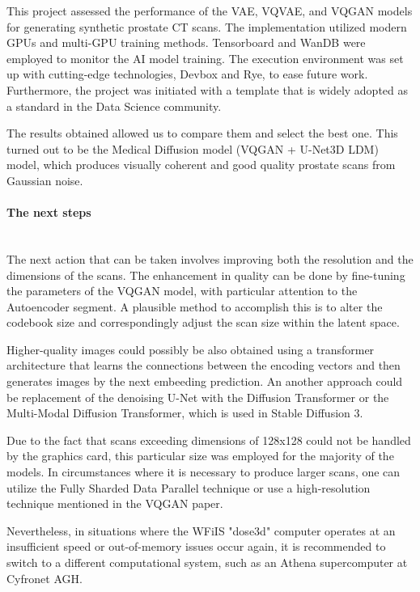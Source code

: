 This project assessed the performance of the VAE, VQVAE, and VQGAN models for generating synthetic prostate CT scans. The implementation utilized modern GPUs and multi-GPU training methods. Tensorboard and WanDB were employed to monitor the AI model training. The execution environment was set up with cutting-edge technologies, Devbox and Rye, to ease future work. Furthermore, the project was initiated with a template that is widely adopted as a standard in the Data Science community.

 The results obtained allowed us to compare them and select the best one. This turned out to be the Medical Diffusion model (VQGAN + U-Net3D LDM) model\cite{khader2023medicaldiffusiondenoisingdiffusion}, which produces visually coherent and good quality prostate scans from Gaussian noise.  

\paragraph{The next steps}\mbox{}\\
\indent The next action that can be taken involves improving both the resolution and the dimensions of the scans. The enhancement in quality can be done by fine-tuning the parameters of the VQGAN model, with particular attention to the Autoencoder segment. A plausible method to accomplish this is to alter the codebook size and correspondingly adjust the scan size within the latent space.

Higher-quality images could possibly be also obtained using a transformer architecture that learns the connections between the encoding vectors and then generates images by the next embeeding prediction\cite{esser2021tamingtransformershighresolutionimage}\cite{khader_transformers_2023}. An another approach could be replacement of the denoising U-Net with the Diffusion Transformer\cite{peebles2023scalablediffusionmodelstransformers} or the Multi-Modal Diffusion Transformer\cite{esser2024scaling}, which is used in Stable Diffusion 3\cite{esser2024scaling}.  

Due to the fact that scans exceeding dimensions of 128x128 could not be handled by the graphics card, this particular size was employed for the majority of the models. In circumstances where it is necessary to produce larger scans, one can utilize the Fully Sharded Data Parallel technique or use a high-resolution technique mentioned in the VQGAN paper\cite{esser2021tamingtransformershighresolutionimage}. 

Nevertheless, in situations where the WFiIS "dose3d" computer operates at an insufficient speed or out-of-memory issues occur again, it is recommended to switch to a different computational system, such as an Athena supercomputer at Cyfronet AGH.

